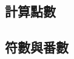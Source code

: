 \documentclass[utf8]{beamer}
\begin{document}
\begin{CJK}{UTF8}{bkai}
\section{計算點數}

\subsection{符數與番數}

\clearpage
\end{CJK}
\end{document}
